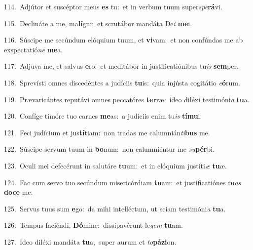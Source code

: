 {\numbfont\textcolor{\numbcolor}{114.}}~Adjútor et suscéptor meus \textbf{es} tu:~\star et in verbum tuum super\-\textit{spe}\-\textbf{rá}vi.\par
{\numbfont\textcolor{\numbcolor}{115.}}~Declináte a me, ma\-\textbf{lí}\-gni:~\star et scrutábor mandáta De\textit{i} \textbf{me}\-i.\par
{\numbfont\textcolor{\numbcolor}{116.}}~Súscipe me secúndum elóquium tuum, et \textbf{vi}\-vam:~\star et non confúndas me ab exspectatió\textit{ne} \textbf{me}\-a.\par
{\numbfont\textcolor{\numbcolor}{117.}}~Adjuva me, et salvus \textbf{e}\-ro:~\star et meditábor in justificatiónibus tu\textit{is} \textbf{sem}\-per.\par
{\numbfont\textcolor{\numbcolor}{118.}}~Sprevísti omnes discedéntes a judíciis \textbf{tu}\-is:~\star quia injústa cogitátio \textit{e}\-\textbf{ó}rum.\par
{\numbfont\textcolor{\numbcolor}{119.}}~Prævaricántes reputávi omnes peccatóres \textbf{ter}\-ræ:~\star ídeo diléxi testimóni\textit{a} \textbf{tu}\-a.\par
{\numbfont\textcolor{\numbcolor}{120.}}~Confíge timóre tuo carnes \textbf{me}\-as:~\star a judíciis enim tu\textit{is} \textbf{tí}\-\textbf{mu}i.\par
{\numbfont\textcolor{\numbcolor}{121.}}~Feci judícium et jus\-\textbf{tí}\-tiam:~\star non tradas me calumnián\-\textit{ti}\-\textbf{bus} me.\par
{\numbfont\textcolor{\numbcolor}{122.}}~Súscipe servum tuum in \textbf{bo}\-num:~\star non calumniéntur me \textit{su}\-\textbf{pér}bi.\par
{\numbfont\textcolor{\numbcolor}{123.}}~Oculi mei defecérunt in salutáre \textbf{tu}\-um:~\star et in elóquium justíti\textit{æ} \textbf{tu}\-æ.\par
{\numbfont\textcolor{\numbcolor}{124.}}~Fac cum servo tuo secúndum misericórdiam \textbf{tu}\-am:~\star et justificatiónes tu\textit{as} \textbf{do}\-\textbf{ce} me.\par
{\numbfont\textcolor{\numbcolor}{125.}}~Servus tuus sum \textbf{e}\-go:~\star da mihi intelléctum, ut sciam testimóni\textit{a} \textbf{tu}\-a.\par
{\numbfont\textcolor{\numbcolor}{126.}}~Tempus faciéndi, \textbf{Dó}\-mine:~\star dissipavérunt le\textit{gem} \textbf{tu}\-am.\par
{\numbfont\textcolor{\numbcolor}{127.}}~Ideo diléxi mandáta \textbf{tu}\-a,~\star super aurum et \textit{to}\-\textbf{pá}\textbf{zi}on.\par
